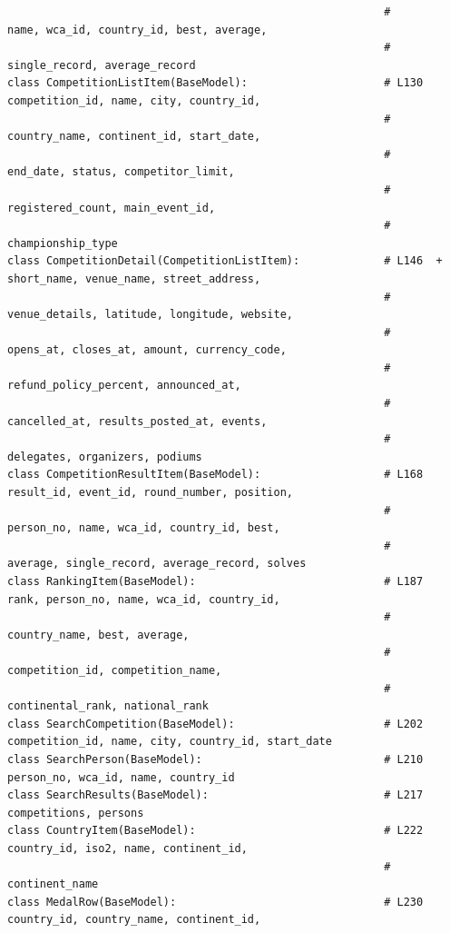 \documentclass[11pt,a4paper]{article}
\begin{document}
\begin{lstlisting}
                                                          #       name, wca_id, country_id, best, average,
                                                          #       single_record, average_record
class CompetitionListItem(BaseModel):                     # L130  competition_id, name, city, country_id,
                                                          #       country_name, continent_id, start_date,
                                                          #       end_date, status, competitor_limit,
                                                          #       registered_count, main_event_id,
                                                          #       championship_type
class CompetitionDetail(CompetitionListItem):             # L146  + short_name, venue_name, street_address,
                                                          #       venue_details, latitude, longitude, website,
                                                          #       opens_at, closes_at, amount, currency_code,
                                                          #       refund_policy_percent, announced_at,
                                                          #       cancelled_at, results_posted_at, events,
                                                          #       delegates, organizers, podiums
class CompetitionResultItem(BaseModel):                   # L168  result_id, event_id, round_number, position,
                                                          #       person_no, name, wca_id, country_id, best,
                                                          #       average, single_record, average_record, solves
class RankingItem(BaseModel):                             # L187  rank, person_no, name, wca_id, country_id,
                                                          #       country_name, best, average,
                                                          #       competition_id, competition_name,
                                                          #       continental_rank, national_rank
class SearchCompetition(BaseModel):                       # L202  competition_id, name, city, country_id, start_date
class SearchPerson(BaseModel):                            # L210  person_no, wca_id, name, country_id
class SearchResults(BaseModel):                           # L217  competitions, persons
class CountryItem(BaseModel):                             # L222  country_id, iso2, name, continent_id,
                                                          #       continent_name
class MedalRow(BaseModel):                                # L230  country_id, country_name, continent_id,

\end{lstlisting}
\end{document}
